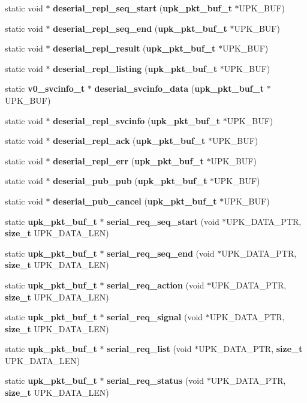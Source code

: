 \begin{DoxyCompactItemize}
\item 
static void $\ast$ {\bf deserial\_\-repl\_\-seq\_\-start} ({\bf upk\_\-pkt\_\-buf\_\-t} $\ast$UPK\_\-BUF)
\item 
static void $\ast$ {\bf deserial\_\-repl\_\-seq\_\-end} ({\bf upk\_\-pkt\_\-buf\_\-t} $\ast$UPK\_\-BUF)
\item 
static void $\ast$ {\bf deserial\_\-repl\_\-result} ({\bf upk\_\-pkt\_\-buf\_\-t} $\ast$UPK\_\-BUF)
\item 
static void $\ast$ {\bf deserial\_\-repl\_\-listing} ({\bf upk\_\-pkt\_\-buf\_\-t} $\ast$UPK\_\-BUF)
\item 
static {\bf v0\_\-svcinfo\_\-t} $\ast$ {\bf deserial\_\-svcinfo\_\-data} ({\bf upk\_\-pkt\_\-buf\_\-t} $\ast$UPK\_\-BUF)
\item 
static void $\ast$ {\bf deserial\_\-repl\_\-svcinfo} ({\bf upk\_\-pkt\_\-buf\_\-t} $\ast$UPK\_\-BUF)
\item 
static void $\ast$ {\bf deserial\_\-repl\_\-ack} ({\bf upk\_\-pkt\_\-buf\_\-t} $\ast$UPK\_\-BUF)
\item 
static void $\ast$ {\bf deserial\_\-repl\_\-err} ({\bf upk\_\-pkt\_\-buf\_\-t} $\ast$UPK\_\-BUF)
\item 
static void $\ast$ {\bf deserial\_\-pub\_\-pub} ({\bf upk\_\-pkt\_\-buf\_\-t} $\ast$UPK\_\-BUF)
\item 
static void $\ast$ {\bf deserial\_\-pub\_\-cancel} ({\bf upk\_\-pkt\_\-buf\_\-t} $\ast$UPK\_\-BUF)
\item 
static {\bf upk\_\-pkt\_\-buf\_\-t} $\ast$ {\bf serial\_\-req\_\-seq\_\-start} (void $\ast$UPK\_\-DATA\_\-PTR, {\bf size\_\-t} UPK\_\-DATA\_\-LEN)
\item 
static {\bf upk\_\-pkt\_\-buf\_\-t} $\ast$ {\bf serial\_\-req\_\-seq\_\-end} (void $\ast$UPK\_\-DATA\_\-PTR, {\bf size\_\-t} UPK\_\-DATA\_\-LEN)
\item 
static {\bf upk\_\-pkt\_\-buf\_\-t} $\ast$ {\bf serial\_\-req\_\-action} (void $\ast$UPK\_\-DATA\_\-PTR, {\bf size\_\-t} UPK\_\-DATA\_\-LEN)
\item 
static {\bf upk\_\-pkt\_\-buf\_\-t} $\ast$ {\bf serial\_\-req\_\-signal} (void $\ast$UPK\_\-DATA\_\-PTR, {\bf size\_\-t} UPK\_\-DATA\_\-LEN)
\item 
static {\bf upk\_\-pkt\_\-buf\_\-t} $\ast$ {\bf serial\_\-req\_\-list} (void $\ast$UPK\_\-DATA\_\-PTR, {\bf size\_\-t} UPK\_\-DATA\_\-LEN)
\item 
static {\bf upk\_\-pkt\_\-buf\_\-t} $\ast$ {\bf serial\_\-req\_\-status} (void $\ast$UPK\_\-DATA\_\-PTR, {\bf size\_\-t} UPK\_\-DATA\_\-LEN)

\end{DoxyCompactItemize}
